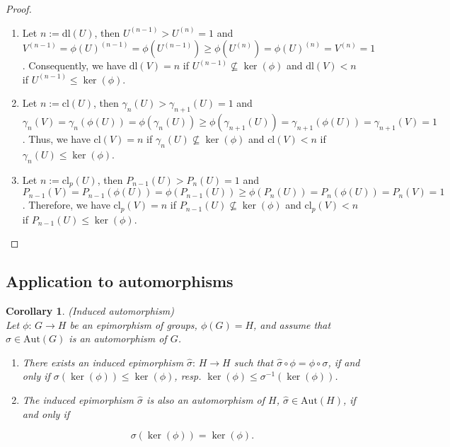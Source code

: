 \documentclass{amsart}
\newtheorem{corollary}{Corollary}[section]
\theoremstyle{definition}
\numberwithin{equation}{section}
\begin{document}
\begin{proof}
\begin{enumerate}
\item
Let \(n:=\mathrm{dl}(U)\), then
\(U^{(n-1)}>U^{(n)}=1\) and
\(V^{(n-1)}=\phi(U)^{(n-1)}=\phi(U^{(n-1)})\ge\phi(U^{(n)})=\phi(U)^{(n)}=V^{(n)}=1\).
Consequently, we have \(\mathrm{dl}(V)=n\) if \(U^{(n-1)}\not\subseteq\ker(\phi)\)
and \(\mathrm{dl}(V)<n\) if \(U^{(n-1)}\le\ker(\phi)\).
\item
Let \(n:=\mathrm{cl}(U)\), then
\(\gamma_n(U)>\gamma_{n+1}(U)=1\) and
\(\gamma_n(V)=\gamma_n(\phi(U))=\phi(\gamma_n(U))\ge\phi(\gamma_{n+1}(U))=\gamma_{n+1}(\phi(U))=\gamma_{n+1}(V)=1\).
Thus, we have \(\mathrm{cl}(V)=n\) if \(\gamma_n(U)\not\subseteq\ker(\phi)\)
and \(\mathrm{cl}(V)<n\) if \(\gamma_n(U)\le\ker(\phi)\).
\item
Let \(n:=\mathrm{cl}_p(U)\), then
\(P_{n-1}(U)>P_n(U)=1\) and
\(P_{n-1}(V)=P_{n-1}(\phi(U))=\phi(P_{n-1}(U))\ge\phi(P_n(U))=P_n(\phi(U))=P_n(V)=1\).
Therefore, we have \(\mathrm{cl}_p(V)=n\) if \(P_{n-1}(U)\not\subseteq\ker(\phi)\)
and \(\mathrm{cl}_p(V)<n\) if \(P_{n-1}(U)\le\ker(\phi)\).
\end{enumerate}
\end{proof}



\subsection{Application to automorphisms}
\label{ss:IndAut}

\begin{corollary}
\label{cor:IndAutQtn}
(Induced automorphism)\\
Let \(\phi:\,G\to H\) be an \textit{epimorphism} of groups, \(\phi(G)=H\),
and assume that \(\sigma\in\mathrm{Aut}(G)\) is an automorphism of \(G\). 

\begin{enumerate}
\item
There exists an induced epimorphism \(\hat{\sigma}:\,H\to H\)
such that \(\hat{\sigma}\circ\phi=\phi\circ\sigma\),
if and only if \(\sigma(\ker(\phi))\le\ker(\phi)\),
resp. \(\ker(\phi)\le\sigma^{-1}(\ker(\phi))\).
\item
The induced epimorphism \(\hat{\sigma}\) is also an automorphism of \(H\),
\(\hat{\sigma}\in\mathrm{Aut}(H)\),
if and only if

\begin{equation}
\label{eqn:KIP}
\sigma(\ker(\phi))=\ker(\phi).
\end{equation}

\end{enumerate}

\end{corollary}
\end{document}
